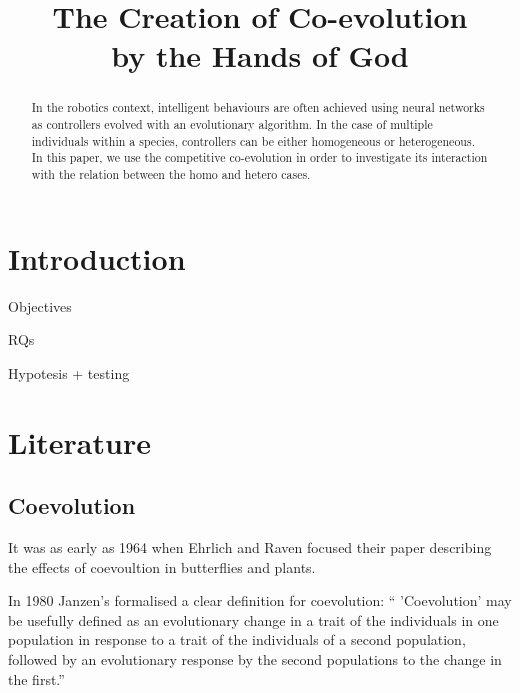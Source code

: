 \documentclass[conference]{IEEEtran}
\begin{document}
\title{The Creation of Co-evolution \\ by the Hands of God}



\author{
}



\maketitle


\begin{abstract}
In the robotics context, intelligent behaviours are often achieved using neural networks as controllers evolved with an evolutionary algorithm.
In the case of multiple individuals within a species, controllers can be either homogeneous or heterogeneous.
In this paper, we use the competitive co-evolution in order to investigate its interaction with the relation between the homo and hetero cases.
\end{abstract}


\IEEEpeerreviewmaketitle


\section{Introduction}
Objectives

RQs

Hypotesis + testing


\section{Literature}
 

\subsection{Coevolution}
It was as early as 1964 when Ehrlich and Raven focused their paper \cite{ehrlich1964butterflies} describing the effects of coevoultion in butterflies and plants.

In 1980 Janzen's \cite{janzen1980coevolution} formalised a clear definition for coevolution:
`` 'Coevolution' may be usefully defined as an evolutionary change in a trait of the individuals in one population in response to a trait of the individuals of a second population, followed by an evolutionary response by the second populations to the change in the first.''
\end{document}
